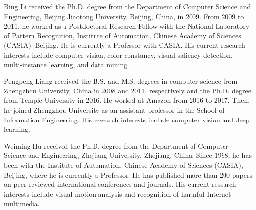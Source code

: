 \documentclass[journal]{IEEEtran}
\begin{document}
\begin{IEEEbiography}
{Bing Li}
received the Ph.D. degree from the Department of Computer Science and Engineering, Beijing Jiaotong University, Beijing, China, in 2009. From 2009 to 2011, he worked as a Postdoctoral Research Fellow with the National Laboratory of Pattern Recognition, Institute of Automation, Chinese Academy of Sciences (CASIA), Beijing. He is currently a Professor with CASIA. His current research interests include computer vision, color constancy, visual saliency detection, multi-instance learning, and data mining.
\end{IEEEbiography}

\begin{IEEEbiography}
{Pengpeng Liang}
received the B.S. and M.S. degrees in computer science from Zhengzhou University, China in 2008 and 2011, respectively and the Ph.D. degree from Temple University in 2016. He worked at Amazon from 2016 to 2017. Then, he joined Zhengzhou University as an assistant professor in the School of Information Engineering. His research interests include computer vision and deep learning.
\end{IEEEbiography}

\begin{IEEEbiography}
{Weiming Hu}
received the Ph.D. degree from the Department of Computer Science and Engineering, Zhejiang University, Zhejiang, China. Since 1998, he has been with the Institute of Automation, Chinese Academy of Sciences (CASIA), Beijing, where he is currently a Professor. He has published more than 200 papers on peer reviewed international conferences and journals. His current research interests include visual motion analysis and recognition of harmful Internet multimedia.
\end{IEEEbiography}
\end{document}

